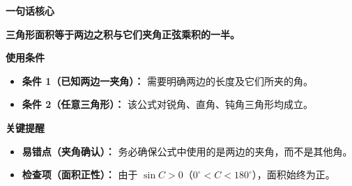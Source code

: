 \begin{summarybox}
	\textbf{\textcolor{CSummary}{一句话核心}}

	\textbf{三角形面积等于两边之积与它们夹角正弦乘积的一半。}

	\medskip
	\textbf{\textcolor{CSummary}{使用条件}}
	\begin{itemize}[leftmargin=*, itemsep=0.5em, topsep=0.4em]
		\item \textbf{条件 1（已知两边一夹角）：} 需要明确两边的长度及它们所夹的角。
		\item \textbf{条件 2（任意三角形）：} 该公式对锐角、直角、钝角三角形均成立。
	\end{itemize}

	\medskip
	\textbf{\textcolor{CSummary}{关键提醒}}
	\begin{itemize}[leftmargin=*, itemsep=0.5em, topsep=0.4em]
		\item \textbf{易错点（夹角确认）：} 务必确保公式中使用的是两边的夹角，而不是其他角。
		\item \textbf{检查项（面积正性）：} 由于 $\sin C > 0$（$0^\circ<C<180^\circ$），面积始终为正。
	\end{itemize}
\end{summarybox}
